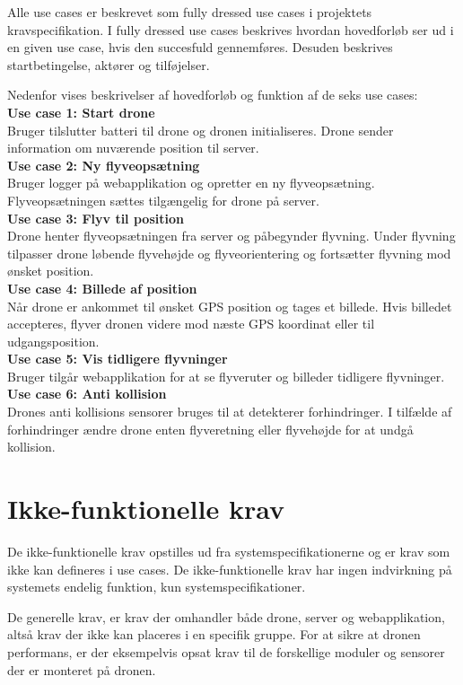 Alle use cases er beskrevet som fully dressed use cases i projektets kravspecifikation. 
I fully dressed use cases beskrives hvordan hovedforløb ser ud i en given use case, hvis den succesfuld gennemføres. Desuden beskrives startbetingelse, aktører og tilføjelser.

Nedenfor vises beskrivelser af hovedforløb og funktion af de seks use cases:\\

\textbf{Use case 1: Start drone} \\
Bruger tilslutter batteri til drone og dronen initialiseres. Drone sender information om nuværende position til server.\\

\textbf{Use case 2: Ny flyveopsætning} \\
Bruger logger på webapplikation og opretter en ny flyveopsætning. Flyveopsætningen sættes tilgængelig for drone på server.\\

\textbf{Use case 3: Flyv til position}\\
Drone henter flyveopsætningen fra server og påbegynder flyvning. Under flyvning tilpasser drone  løbende flyvehøjde og flyveorientering og fortsætter flyvning mod ønsket position. \\

\textbf{Use case 4: Billede af position} \\
Når drone er ankommet til ønsket GPS position og tages et billede. Hvis billedet accepteres, flyver dronen videre mod næste GPS koordinat eller til udgangsposition. \\

\textbf{Use case 5: Vis tidligere flyvninger} \\
Bruger tilgår webapplikation for at se flyveruter og billeder tidligere flyvninger.\\

\textbf{Use case 6: Anti kollision} \\
Drones anti kollisions sensorer bruges til at detekterer forhindringer. I tilfælde af forhindringer ændre drone enten flyveretning eller flyvehøjde for at undgå kollision. \\



\section{Ikke-funktionelle krav}

De ikke-funktionelle krav opstilles ud fra systemspecifikationerne og er krav som ikke kan defineres i use cases. De ikke-funktionelle krav har ingen indvirkning på systemets endelig funktion, kun systemspecifikationer.  

De generelle krav, er krav der omhandler både drone, server og webapplikation, altså krav der ikke kan placeres i en specifik gruppe. For at sikre at dronen performans, er der eksempelvis opsat krav til de forskellige moduler og sensorer der er monteret på dronen. 
